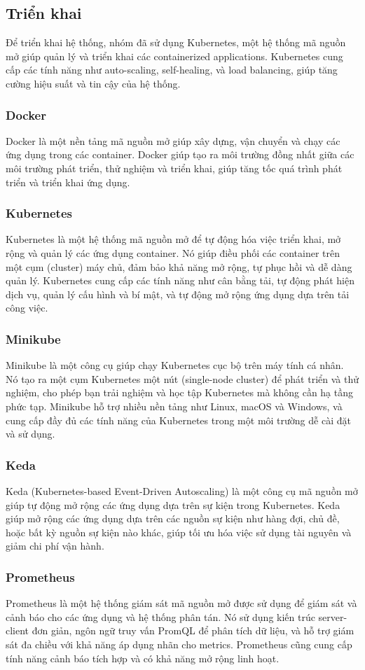 \subsection{Triển khai}
\noindent Để triển khai hệ thống, nhóm đã sử dụng Kubernetes, một hệ thống mã nguồn mở giúp quản lý và triển khai các containerized applications. Kubernetes cung cấp các tính năng như auto-scaling, self-healing, và load balancing, giúp tăng cường hiệu suất và tin cậy của hệ thống.
\subsubsection{Docker}
\noindent Docker là một nền tảng mã nguồn mở giúp xây dựng, vận chuyển và chạy các ứng dụng trong các container. Docker giúp tạo ra môi trường đồng nhất giữa các môi trường phát triển, thử nghiệm và triển khai, giúp tăng tốc quá trình phát triển và triển khai ứng dụng.
\subsubsection{Kubernetes}
Kubernetes là một hệ thống mã nguồn mở để tự động hóa việc triển khai, mở rộng và quản lý các ứng dụng container. Nó giúp điều phối các container trên một cụm (cluster) máy chủ, đảm bảo khả năng mở rộng, tự phục hồi và dễ dàng quản lý. Kubernetes cung cấp các tính năng như cân bằng tải, tự động phát hiện dịch vụ, quản lý cấu hình và bí mật, và tự động mở rộng ứng dụng dựa trên tải công việc.
\subsubsection{Minikube}
Minikube là một công cụ giúp chạy Kubernetes cục bộ trên máy tính cá nhân. 
Nó tạo ra một cụm Kubernetes một nút (single-node cluster) để phát triển và thử nghiệm, cho phép bạn trải nghiệm và học tập Kubernetes mà không cần hạ tầng phức tạp. 
Minikube hỗ trợ nhiều nền tảng như Linux, macOS và Windows, và cung cấp đầy đủ các tính năng của Kubernetes trong một môi trường dễ cài đặt và sử dụng.
\subsubsection{Keda}
Keda (Kubernetes-based Event-Driven Autoscaling) là một công cụ mã nguồn mở giúp tự động mở rộng các ứng dụng dựa trên sự kiện trong Kubernetes. 
Keda giúp mở rộng các ứng dụng dựa trên các nguồn sự kiện như hàng đợi, chủ đề, hoặc bất kỳ nguồn sự kiện nào khác, 
giúp tối ưu hóa việc sử dụng tài nguyên và giảm chi phí vận hành.
\subsubsection{Prometheus}
Prometheus là một hệ thống giám sát mã nguồn mở được sử dụng để giám sát và cảnh báo cho các ứng dụng và 
hệ thống phân tán. Nó sử dụng kiến trúc server-client đơn giản, ngôn ngữ truy vấn PromQL để phân tích dữ liệu, 
và hỗ trợ giám sát đa chiều với khả năng áp dụng nhãn cho metrics. Prometheus cũng cung cấp tính năng cảnh báo tích hợp và có khả năng mở rộng linh hoạt.
